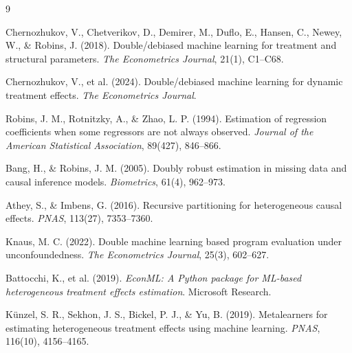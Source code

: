 \documentclass[11pt]{article}
\begin{document}
\begin{thebibliography}{9}

Chernozhukov, V., Chetverikov, D., Demirer, M., Duflo, E., Hansen, C., Newey, W., \& Robins, J. (2018).
Double/debiased machine learning for treatment and structural parameters.
\textit{The Econometrics Journal}, 21(1), C1--C68.

Chernozhukov, V., et al. (2024).
Double/debiased machine learning for dynamic treatment effects.
\textit{The Econometrics Journal}.

Robins, J. M., Rotnitzky, A., \& Zhao, L. P. (1994).
Estimation of regression coefficients when some regressors are not always observed.
\textit{Journal of the American Statistical Association}, 89(427), 846--866.

Bang, H., \& Robins, J. M. (2005).
Doubly robust estimation in missing data and causal inference models.
\textit{Biometrics}, 61(4), 962--973.

Athey, S., \& Imbens, G. (2016).
Recursive partitioning for heterogeneous causal effects.
\textit{PNAS}, 113(27), 7353--7360.

Knaus, M. C. (2022).
Double machine learning based program evaluation under unconfoundedness.
\textit{The Econometrics Journal}, 25(3), 602--627.

Battocchi, K., et al. (2019).
\textit{EconML: A Python package for ML-based heterogeneous treatment effects estimation}.
Microsoft Research.

K\"unzel, S. R., Sekhon, J. S., Bickel, P. J., \& Yu, B. (2019).
Metalearners for estimating heterogeneous treatment effects using machine learning.
\textit{PNAS}, 116(10), 4156--4165.

\end{thebibliography}
\end{document}
